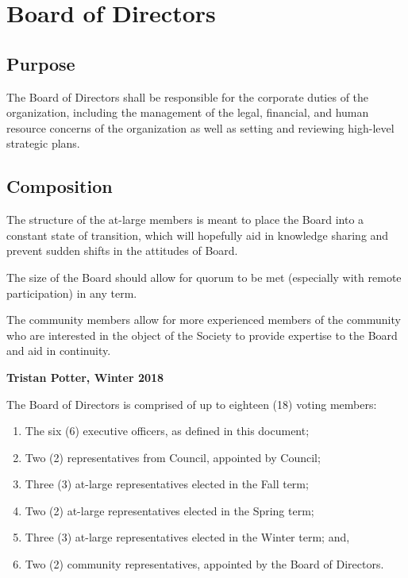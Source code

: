 \section{Board of Directors}
\subsection{Purpose}
The Board of Directors shall be responsible for the corporate duties of the
organization, including the management of the legal, financial, and human
resource concerns of the organization as well as setting and reviewing
high-level strategic plans.

\subsection{Composition}
\begin{annotation}
    The structure of the at-large members is meant to place the Board into
    a constant state of transition, which will hopefully aid in knowledge
    sharing and prevent sudden shifts in the attitudes of Board. 

    The size of the Board should allow for quorum to be met (especially with
    remote participation) in any term. 

    The community members allow for more experienced members of the community
    who are interested in the object of the Society to provide expertise to the
    Board and aid in continuity.

    \textbf{Tristan Potter, Winter 2018}
\end{annotation}

The Board of Directors is comprised of up to eighteen (18) voting members:
\begin{enumerate}
    \item The six (6) executive officers, as defined in this document; 
    \item Two (2) representatives from Council, appointed by Council; 
    \item Three (3) at-large representatives elected in the Fall term;
    \item Two (2) at-large representatives elected in the Spring term;
    \item Three (3) at-large representatives elected in the Winter term; and,
    \item Two (2) community representatives, appointed by the Board of Directors.
\end{enumerate}

